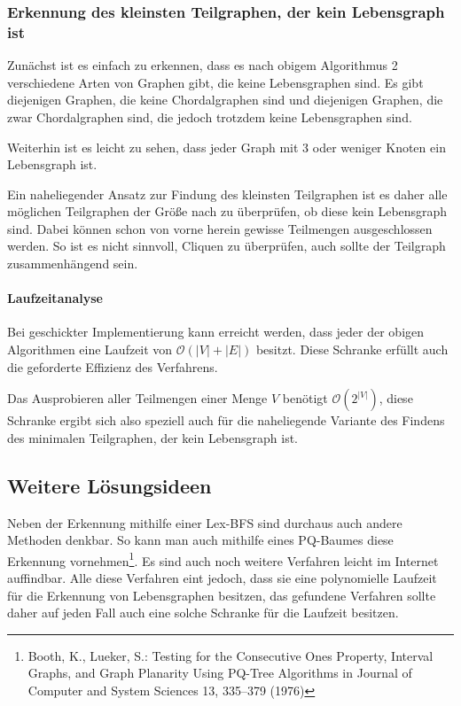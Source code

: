 \subsubsection{Erkennung des kleinsten Teilgraphen, der kein Lebensgraph ist} 

Zunächst ist es einfach zu erkennen, dass es nach obigem Algorithmus 2 verschiedene Arten von Graphen gibt, die keine Lebensgraphen sind. Es gibt diejenigen Graphen, die keine Chordalgraphen sind und diejenigen Graphen, die zwar Chordalgraphen sind, die jedoch trotzdem keine Lebensgraphen sind.

Weiterhin ist es leicht zu sehen, dass jeder Graph mit 3 oder weniger Knoten ein Lebensgraph ist.

Ein naheliegender Ansatz zur Findung des kleinsten Teilgraphen ist es daher alle möglichen Teilgraphen der Größe nach zu überprüfen, ob diese kein Lebensgraph sind. Dabei können schon von vorne herein gewisse Teilmengen ausgeschlossen werden. So ist es nicht sinnvoll, Cliquen zu überprüfen, auch sollte der Teilgraph zusammenhängend sein.

 
\paragraph{Laufzeitanalyse}

Bei geschickter Implementierung kann erreicht werden, dass jeder der obigen Algorithmen eine Laufzeit von $\mathcal{O}(|V| + |E|)$ besitzt. Diese Schranke erfüllt auch die geforderte Effizienz des Verfahrens.

Das Ausprobieren aller Teilmengen einer Menge $V$ benötigt $\mathcal{O}(2^{|V|})$, diese Schranke ergibt sich also speziell auch für die naheliegende Variante des Findens des minimalen Teilgraphen, der kein Lebensgraph ist.

\subsection{Weitere Lösungsideen}

Neben der Erkennung mithilfe einer Lex-BFS sind durchaus auch andere Methoden denkbar. So kann man auch mithilfe eines PQ-Baumes diese Erkennung vornehmen\footnote{Booth, K., Lueker, S.: Testing for the Consecutive Ones Property, Interval Graphs, and Graph Planarity Using PQ-Tree Algorithms in Journal of Computer and System Sciences 13, 335--379 (1976)}. Es sind auch noch weitere Verfahren leicht im Internet auffindbar. Alle diese Verfahren eint jedoch, dass sie eine polynomielle Laufzeit für die Erkennung von Lebensgraphen besitzen, das gefundene Verfahren sollte daher auf jeden Fall auch eine solche Schranke für die Laufzeit besitzen.

